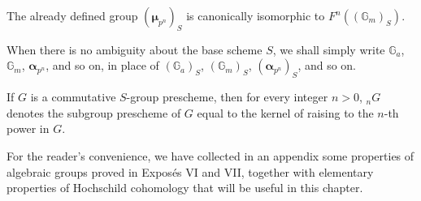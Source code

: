 The already defined group \((\boldsymbol\mu_{p^n})_S\) is canonically isomorphic
to \(F^n((\mathbb G_m)_S)\).

When there is no ambiguity about the base scheme \(S\), we shall simply write
\(\mathbb G_a\), \(\mathbb G_m\), \(\boldsymbol\alpha_{p^n}\), and so on, in
place of \((\mathbb G_a)_S\), \((\mathbb G_m)_S\),
\((\boldsymbol\alpha_{p^n})_S\), and so on.

If \(G\) is a commutative \(S\)-group prescheme, then for every integer \(n>0\),
\({}_nG\) denotes the subgroup prescheme of \(G\) equal to the kernel of
raising to the \(n\)-th power in \(G\).

For the reader's convenience, we have collected in an appendix some properties
of algebraic groups proved in Exposés VI and VII, together with elementary
properties of Hochschild cohomology that will be useful in this chapter.
